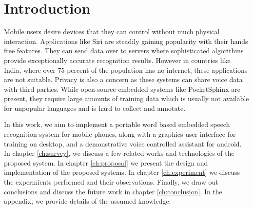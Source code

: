 \chapter{Introduction}
\hspace{3mm}

Mobile users desire devices that they can control without much physical interaction. Applications like Siri are steadily gaining popularity with their hands free features. They can send data over to servers where sophisticated algorithms provide exceptionally accurate recognition results.
However in countries like India, where over 75 percent of the population has no internet, these applications are not suitable. Privacy is also a concern as these systems can share voice data with third parties. While open-source embedded systems like PocketSphinx are present, they require large amounts of training data which is usually not available for unpopular languages and is hard to collect and annotate.

In this work, we aim to implement a portable word based embedded speech recognition system for mobile phones, along with a graphics user interface for training on desktop, and a demonstrative voice controlled assistant for android. In chapter \ref{ch:survey}, we discuss a few related works and technologies of the proposed system. In chapter \ref{ch:proposal} we present the design and implementation of the proposed systems. In chapter \ref{ch:experiment} we discuss the expermients performed and their observations. Finally, we draw out conclusions and discuss the future work in chapter \ref{ch:conclusion}. In the appendix, we provide details of the assumed knowledge.